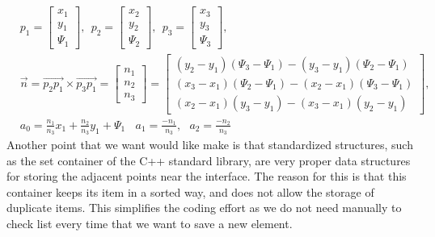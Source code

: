 \documentclass[review]{elsarticle}
\begin{document}
\begin{align}
&p_1=
\begin{bmatrix}
    x_1 \\
    y_1 \\
    \varPsi_1
\end{bmatrix}
,\ \ 
p_2=
\begin{bmatrix}
    x_2 \\
    y_2 \\
    \varPsi_2
\end{bmatrix} 
,\ \ p_3=
\begin{bmatrix}
    x_3 \\
    y_3 \\
    \varPsi_3
\end{bmatrix}, \nonumber\\
&\overrightarrow{n}=\overrightarrow{p_2p_1}\times\overrightarrow{p_3p_1}=
\begin{bmatrix}
    n_1 \\
    n_2 \\
    n_3
\end{bmatrix}=
\begin{bmatrix}
    (y_2-y_1)(\varPsi_3-\varPsi_1)-(y_3-y_1)(\varPsi_2-\varPsi_1) \\
    (x_3-x_1)(\varPsi_2-\varPsi_1)-(x_2-x_1)(\varPsi_3-\varPsi_1) \\
    (x_2-x_1)(y_3-y_1)-(x_3-x_1)(y_2-y_1)
\end{bmatrix},\\
&a_0=\frac{n_1}{n_3}x_1+\frac{n_2}{n_3}y_1+\varPsi_1 \ \ \  \ a_1=\frac{-n_1}{n_3}, \ \ \ a_2=\frac{-n_2}{n_3}
\end{align}
Another point that we want would like make is that standardized structures, such as the set container of the C++ standard library, are very proper data structures for storing the 
adjacent points near the interface. The reason for this is that this container keeps its item in a sorted way, and does not allow the storage of duplicate items. 
This simplifies the coding effort as we do not need manually to check list every time that we want to save a new element. 
\end{document}

